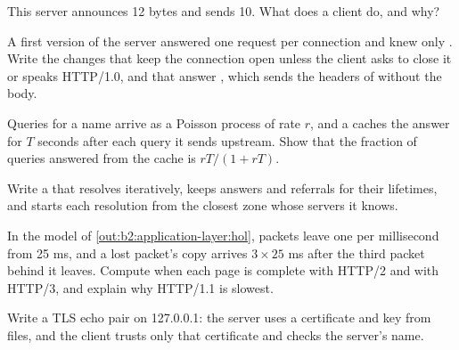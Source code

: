 \begin{exercise}[$\star\star$]\label{exo:b2:application-layer:6}
This server announces 12 bytes and sends 10. What does a client do, and why?
\end{exercise}

\begin{exercise}[$\star\star$]\label{exo:b2:application-layer:7}
A first version of the server answered one request per connection and knew only . Write the changes that
keep the connection open unless the client asks to close it or speaks HTTP/1.0, and that answer , which
sends the headers of  without the body.
\end{exercise}

\begin{exercise}[$\star\star$]\label{exo:b2:application-layer:8}
Queries for a name arrive as a Poisson process of rate $r$, and a  caches the answer for $T$ seconds after
each query it sends upstream. Show that the fraction of queries answered from the cache is $rT/(1 + rT)$.
\end{exercise}

\begin{exercise}[$\star\star$]\label{exo:b2:application-layer:9}
Write a  that resolves iteratively, keeps answers and referrals for their lifetimes, and starts each
resolution from the closest zone whose servers it knows.
\end{exercise}

\begin{exercise}[$\star\star\star$]\label{exo:b2:application-layer:10}
In the model of \cref{out:b2:application-layer:hol}, packets leave one per millisecond from 25 ms, and a lost packet's
copy arrives $3 \times 25$ ms after the third packet behind it leaves. Compute when each page is complete with HTTP/2
and with HTTP/3, and explain why HTTP/1.1 is slowest.
\end{exercise}

\begin{exercise}[$\star\star\star$]\label{exo:b2:application-layer:11}
Write a TLS echo pair on 127.0.0.1: the server uses a certificate and key from files, and the client trusts only that
certificate and checks the server's name.
\end{exercise}

